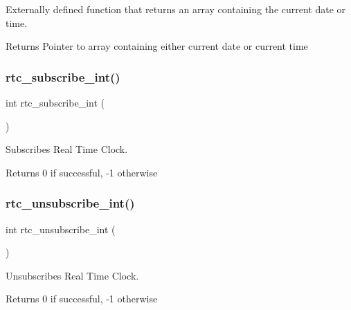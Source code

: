 Externally defined function that returns an array containing the current date or time. 

\begin{DoxyReturn}{Returns}
Pointer to array containing either current date or current time 
\end{DoxyReturn}
\hypertarget{group__rtc_gabd8de825e876e8ef94c64ac616f68a11}{}\label{group__rtc_gabd8de825e876e8ef94c64ac616f68a11} 
\subsubsection{\texorpdfstring{rtc\+\_\+subscribe\+\_\+int()}{rtc\_subscribe\_int()}}
{\footnotesize\ttfamily int rtc\+\_\+subscribe\+\_\+int (\begin{DoxyParamCaption}{ }\end{DoxyParamCaption})}



Subscribes Real Time Clock. 

\begin{DoxyReturn}{Returns}
0 if successful, -\/1 otherwise 
\end{DoxyReturn}
\hypertarget{group__rtc_gab8f17bf5280c908c8b199a90fefcc758}{}\label{group__rtc_gab8f17bf5280c908c8b199a90fefcc758} 
\subsubsection{\texorpdfstring{rtc\+\_\+unsubscribe\+\_\+int()}{rtc\_unsubscribe\_int()}}
{\footnotesize\ttfamily int rtc\+\_\+unsubscribe\+\_\+int (\begin{DoxyParamCaption}{ }\end{DoxyParamCaption})}



Unsubscribes Real Time Clock. 

\begin{DoxyReturn}{Returns}
0 if successful, -\/1 otherwise 
\end{DoxyReturn}
